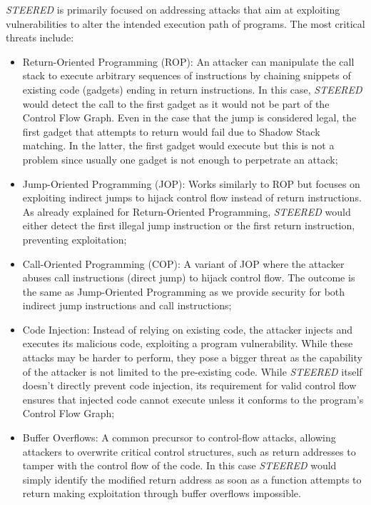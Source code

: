 \textit{STEERED} is primarily focused on addressing attacks that aim at exploiting
vulnerabilities to alter the intended execution path of programs. The most
critical threats include:
\begin{itemize}
  \item Return-Oriented Programming (ROP): An attacker can manipulate the call
    stack to execute arbitrary sequences of instructions by chaining snippets of
    existing code (gadgets) ending in return instructions. In this case, \textit{STEERED}
    would detect the call to the first gadget as it would not be part of the Control
    Flow Graph. Even in the case that the jump is considered legal, the first gadget
    that attempts to return would fail due to Shadow Stack matching. In the
    latter, the first gadget would execute but this is not a problem since usually
    one gadget is not enough to perpetrate an attack;

  \item Jump-Oriented Programming (JOP): Works similarly to ROP but focuses on
    exploiting indirect jumps to hijack control flow instead of return
    instructions. As already explained for Return-Oriented Programming, \textit{STEERED}
    would either detect the first illegal jump instruction or the first return instruction,
    preventing exploitation;

  \item Call-Oriented Programming (COP): A variant of JOP where the attacker
    abuses call instructions (direct jump) to hijack control flow. The outcome is
    the same as Jump-Oriented Programming as we provide security for both indirect
    jump instructions and call instructions;

  \item Code Injection: Instead of relying on existing code, the attacker injects
    and executes its malicious code, exploiting a program vulnerability. While these
    attacks may be harder to perform, they pose a bigger threat as the
    capability of the attacker is not limited to the pre-existing code. While \textit{STEERED}
    itself doesn't directly prevent code injection, its requirement for valid control
    flow ensures that injected code cannot execute unless it conforms to the program's
    Control Flow Graph;

  \item Buffer Overflows: A common precursor to control-flow attacks, allowing attackers
    to overwrite critical control structures, such as return addresses to tamper
    with the control flow of the code. In this case \textit{STEERED} would
    simply identify the modified return address as soon as a function attempts
    to return making exploitation through buffer overflows impossible.
\end{itemize}

